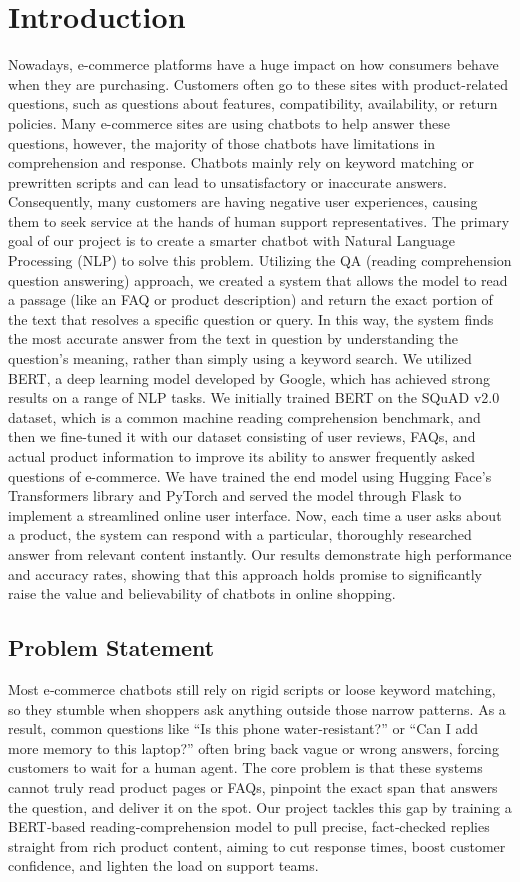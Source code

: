 \documentclass[10pt,conference]{IEEEtran}
\begin{document}
\section{\textbf{Introduction}}
Nowadays, e-commerce platforms have a huge impact on how consumers behave when they are purchasing. Customers often go to these sites with product-related questions, such as questions about features, compatibility, availability, or return policies. Many e-commerce sites are using chatbots to help answer these questions, however, the majority of those chatbots have limitations in comprehension and response. Chatbots mainly rely on keyword matching or prewritten scripts and can lead to unsatisfactory or inaccurate answers. Consequently, many customers are having negative user experiences, causing them to seek service at the hands of human support representatives.
The primary goal of our project is to create a smarter chatbot with Natural Language Processing (NLP) \cite{5} to solve this problem. Utilizing the QA (reading comprehension question answering) approach, we created a system that allows the model to read a passage (like an FAQ or product description) and return the exact portion of the text that resolves a specific question or query. In this way, the system finds the most accurate answer from the text in question by understanding the question's meaning, rather than simply using a keyword search.
We utilized BERT, a deep learning model developed by Google, which has achieved strong results on a range of NLP tasks. We initially trained BERT on the SQuAD v2.0 dataset, which is a common machine reading comprehension benchmark, and then we fine-tuned it with our dataset consisting of user reviews, FAQs, and actual product information to improve its ability to answer frequently asked questions of e-commerce.
We have trained the end model using Hugging Face's Transformers library and PyTorch and served the model through Flask to implement a streamlined online user interface. Now, each time a user asks about a product, the system can respond with a particular, thoroughly researched answer from relevant content instantly. Our results demonstrate high performance and accuracy rates, showing that this approach holds promise to significantly raise the value and believability of chatbots in online shopping.

\subsection{\textbf{Problem Statement}}
Most e‑commerce chatbots still rely on rigid scripts \cite{4} or loose keyword matching, so they stumble when shoppers ask anything outside those narrow patterns. As a result, common questions like “Is this phone water‑resistant?” or “Can I add more memory to this laptop?” often bring back vague or wrong answers, forcing customers to wait for a human agent. The core problem is that these systems cannot truly read product pages or FAQs, pinpoint the exact span that answers the question, and deliver it on the spot. Our project tackles this gap by training a BERT‑based reading‑comprehension model to pull precise, fact‑checked replies straight from rich product content, aiming to cut response times, boost customer confidence, and lighten the load on support teams.
\end{document}
